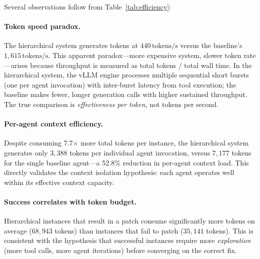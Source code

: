Several observations follow from Table~\ref{tab:efficiency}:

\paragraph{Token speed paradox.} The hierarchical system generates tokens
at $440\,\text{tokens/s}$ versus the baseline's $1{,}615\,\text{tokens/s}$.
This apparent paradox---more expensive system, slower token rate---arises
because throughput is measured as total tokens / total wall time. In the
hierarchical system, the vLLM engine processes multiple sequential short
bursts (one per agent invocation) with inter-burst latency from tool
execution; the baseline makes fewer, longer generation calls with higher
sustained throughput. The true comparison is \emph{effectiveness per token},
not tokens per second.

\paragraph{Per-agent context efficiency.} Despite consuming 7.7$\times$
more total tokens per instance, the hierarchical system generates only
$3{,}388$ tokens per individual agent invocation, versus $7{,}177$ tokens
for the single baseline agent---a 52.8\% reduction in per-agent context
load. This directly validates the context isolation hypothesis: each agent
operates well within its effective context capacity.

\paragraph{Success correlates with token budget.} Hierarchical instances
that result in a patch consume significantly more tokens on average ($68{,}943$
tokens) than instances that fail to patch ($35{,}141$ tokens). This is
consistent with the hypothesis that successful instances require more
\emph{exploration} (more tool calls, more agent iterations) before
converging on the correct fix.
